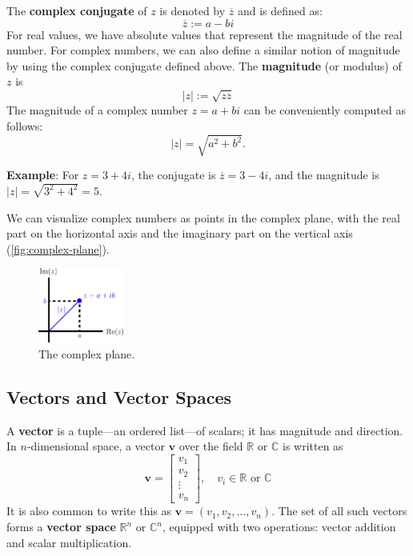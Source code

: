The \textbf{complex conjugate} of $ z $ is denoted by $\overline{z}$ and is defined as:
\begin{equation*}
  \overline{z} := a - b i
\end{equation*}
For real values, we have absolute values that represent the magnitude of the real number.
For complex numbers, we can also define a similar notion of magnitude by using the complex conjugate defined above.
The \textbf{magnitude} (or modulus) of $ z $ is
\begin{equation*}
  |z| := \sqrt{z \overline{z}}
\end{equation*}
The magnitude of a complex number $ z = a + bi $ can be conveniently computed as follows:
\begin{equation*}
  |z| = \sqrt{a^2 + b^2}.
\end{equation*}

\begin{exampleBox}
    \textbf{Example}: For $ z = 3 + 4i $, the conjugate is $ \overline{z} = 3 - 4i $, and the magnitude is $ |z| = \sqrt{3^2 + 4^2} = 5 $.
\end{exampleBox}

We can visualize complex numbers as points in the complex plane, with the real part on the horizontal axis and the imaginary part on the vertical axis (\autoref{fig:complex-plane}).

\begin{figure}[H]
    \centering
    \includegraphics[width=0.25\textwidth]{figs/linear-algebra/complex-plane.pdf}
    \caption{The complex plane.}
    \label{fig:complex-plane}
\end{figure}

\subsection{Vectors and Vector Spaces}
A \textbf{vector} is a tuple---an ordered list---of scalars; it has magnitude and direction. In $ n $-dimensional space, a vector $ \mathbf{v} $ over the field $ \mathbb{R} $ or $ \mathbb{C} $ is written as
\begin{equation*}
    \mathbf{v} = \begin{bmatrix} v_1 \\ v_2 \\ \vdots \\ v_n \end{bmatrix}, \quad v_i \in \mathbb{R} \text{ or } \mathbb{C}
\end{equation*}
It is also common to write this as $\mathbf{v} = (v_1, v_2, \ldots, v_n)$. The set of all such vectors forms a \textbf{vector space} $ \mathbb{R}^n $ or $ \mathbb{C}^n $, equipped with two operations: vector addition and scalar multiplication.

